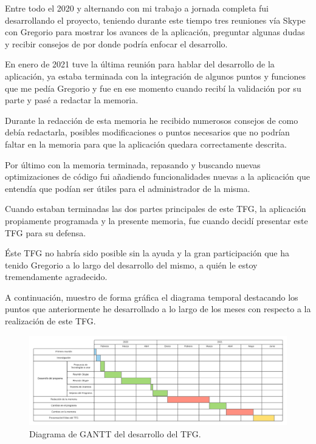 \documentclass[a4paper, 12pt]{book}
\begin{document}
Entre todo el 2020 y alternando con mi trabajo a jornada completa fui desarrollando el proyecto, teniendo durante este tiempo tres reuniones vía Skype con Gregorio para mostrar los avances de la aplicación, preguntar algunas dudas y recibir consejos de por donde podría enfocar el desarrollo.

En enero de 2021 tuve la última reunión para hablar del desarrollo de la aplicación, ya estaba terminada con la integración de algunos puntos y funciones que me pedía Gregorio y fue en ese momento cuando recibí la validación por su parte y pasé a redactar la memoria.

Durante la redacción de esta memoria he recibido numerosos consejos de como debía redactarla, posibles modificaciones o puntos necesarios que no podrían faltar en la memoria para que la aplicación quedara correctamente descrita.

Por último con la memoria terminada, repasando y buscando nuevas optimizaciones de código fui añadiendo funcionalidades nuevas a la aplicación que entendía que podían ser útiles para el administrador de la misma.

Cuando estaban terminadas las dos partes principales de este TFG, la aplicación propiamente programada y la presente memoria, fue cuando decidí presentar este TFG para su defensa.

Éste TFG no habría sido posible sin la ayuda y la gran participación que ha tenido Gregorio a lo largo del desarrollo del mismo, a quién le estoy tremendamente agradecido.

\vspace{5mm}

A continuación, muestro de forma gráfica el diagrama temporal destacando los puntos que anteriormente he desarrollado a lo largo de los meses con respecto a la realización de este TFG.

\begin{figure}[h!]
  \centering
  \includegraphics[width=16cm, keepaspectratio]{img/diagrama.png}
  \caption{Diagrama de GANTT del desarrollo del TFG.}\label{fig:diagrama}
\end{figure}
\end{document}
